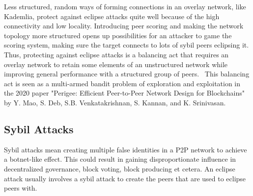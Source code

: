 Less structured, random ways of forming connections in an overlay network, like Kademlia, protect against eclipse attacks quite well because of the high connectivity and low locality. Introducing peer scoring and making the network topology more structured opens up possibilities for an attacker to game the scoring system, making sure the target connects to lots of sybil peers eclipsing it. Thus, protecting against eclipse attacks is a balancing act that requires an overlay network to retain some elements of an unstructured network while improving general performance with a structured group of peers.~\cite{Mao2020-ee} This balancing act is seen as a multi-armed bandit problem of exploration and exploitation in the 2020 paper "Perigee: Efficient Peer-to-Peer Network Design for Blockchains" by Y. Mao, S. Deb, S.B. Venkatakrishnan, S. Kannan, and K. Srinivasan.


\subsection{Sybil Attacks}
Sybil attacks mean creating multiple false identities in a P2P network to achieve a botnet-like effect. This could result in gaining disproportionate influence in decentralized governance, block voting, block producing et cetera. An eclipse attack usually involves a sybil attack to create the peers that are used to eclipse peers with.

